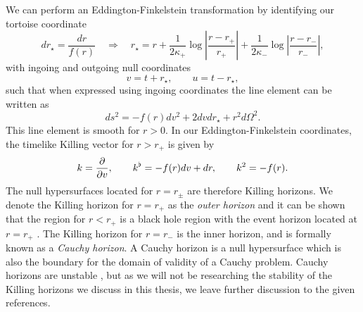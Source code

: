 We can perform an Eddington-Finkelstein transformation by identifying our tortoise coordinate
\begin{equation}
\label{eq:rntortoise}
	dr_\star = \frac{dr}{f(r)} \quad \Rightarrow \quad 	r_\star = r + \frac{1}{2 \kappa_+} \log \left| \frac{r - r_+}{r_+} \right| + \frac{1}{2 \kappa_-} \log \left| \frac{r - r_-}{r_-} \right|,
\end{equation}
with ingoing and outgoing null coordinates
\begin{equation*}
	v = t + r_\star, \qquad u = t - r_\star,
\end{equation*}
such that when expressed using ingoing coordinates the line element can be written as
\begin{equation*}
	ds^2 = - f(r) dv^2 + 2 dv dr_\star + r^2 d\Omega^2.
\end{equation*}
This line element is smooth for $r > 0$. 
In our Eddington-Finkelstein coordinates, the timelike Killing vector for $r > r_+$ is given by
\begin{equation*}
	k = \frac{\partial }{\partial v}, \qquad k^\flat = -f(r) dv + dr, \qquad k^2 = -f(r).
\end{equation*} 
The null hypersurfaces located for $r = r_\pm$ are therefore Killing horizons. We denote the Killing horizon for $r = r_+$ as the \emph{outer horizon} and it can be shown that the region for $r < r_+$ is a black hole region with the event horizon located at $r = r_+$ \cite{Poisson:2009pwt}. The Killing horizon for $r = r_-$ is the inner horizon, and is formally known as a \emph{Cauchy horizon}. A Cauchy horizon is a null hypersurface which is also the boundary for the domain of validity of a Cauchy problem. Cauchy horizons are unstable \cite{Markovic:1994gy}, but as we will not be researching the stability of the Killing horizons we discuss in this thesis, we leave further discussion to the given references.  

